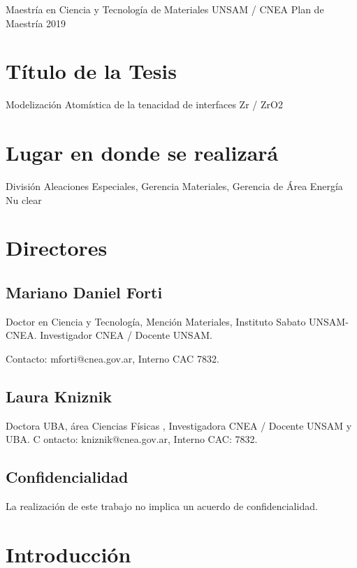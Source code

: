 ﻿
Maestría en Ciencia y Tecnología de Materiales UNSAM / CNEA
Plan de Maestría 2019

\section{ Título de la Tesis }

Modelización Atomística de la tenacidad de interfaces Zr / ZrO2

\section{ Lugar en donde se realizará }
División Aleaciones Especiales, Gerencia Materiales, Gerencia de Área Energía Nu
clear

\section{Directores}

\subsection{Mariano Daniel Forti}

Doctor en Ciencia y Tecnología, Mención Materiales, Instituto Sabato UNSAM-CNEA.
 Investigador CNEA / Docente UNSAM. 

Contacto: mforti@cnea.gov.ar, Interno CAC 7832.

\subsection{Laura Kniznik}

Doctora UBA, área Ciencias Físicas , Investigadora CNEA / Docente UNSAM y UBA. C
ontacto: kniznik@cnea.gov.ar, Interno CAC: 7832.

\subsection{Confidencialidad}

La realización de este trabajo no implica un acuerdo de confidencialidad.

\section{Introducción }


